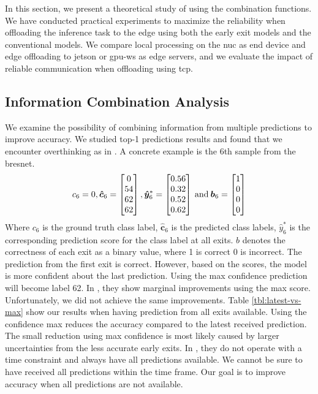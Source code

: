 In this section, we present a theoretical study of using the combination functions. We have conducted practical experiments to maximize the reliability when offloading the inference task to the edge using both the early exit models and the conventional models. We compare local processing on the \gls{nuc} as end device and edge offloading to \gls{jetson} or \gls{gpu-ws} as edge servers, and we evaluate the impact of reliable communication when offloading using \gls{tcp}. 
\subsection{Information Combination Analysis}
We examine the possibility of combining information from multiple predictions to improve accuracy. We studied top-1 predictions results and found that we encounter overthinking as in \cite{kaya_shallow-deep_nodate}. A concrete example is the 6th sample from the \gls{bresnet}.
\begin{align*}
c_6=0,
\bm{\hat{c}}_{6}=
\begin{bmatrix}
0 \\
54 \\
62 \\
62
\end{bmatrix},
\bm{\hat{y}}^{*}_{6}=
\begin{bmatrix}
0.56 \\
0.32 \\
0.52 \\
0.62
\end{bmatrix} \text{\:and\:}
\bm{b}_{6}=
\begin{bmatrix}
1 \\
0 \\
0 \\
0
\end{bmatrix}
\end{align*}
Where $ c_6 $ is the ground truth class label, $ \bm{\hat{c}}_6 $ is the predicted class labels, $ \hat{y}^*_6 $ is the corresponding prediction score for the class label at all exits. $ b $ denotes the correctness of each exit as a binary value, where 1 is correct 0 is incorrect.
The prediction from the first exit is correct. However, based on the scores, the model is more confident about the last prediction. Using the max confidence prediction will become label 62.  In \cite{kaya_shallow-deep_nodate}, they show marginal improvements using the max score. Unfortunately, we did not achieve the same improvements. Table \ref{tbl:latest-vs-max} show our results when having prediction from all exits available. Using the confidence max reduces the accuracy compared to the latest received prediction. The small reduction using max confidence is most likely caused by larger uncertainties from the less accurate early exits. In \cite{kaya_shallow-deep_nodate}, they do not operate with a time constraint and always have all predictions available. We cannot be sure to have received all predictions within the time frame. Our goal is to improve accuracy when all predictions are not available. 
